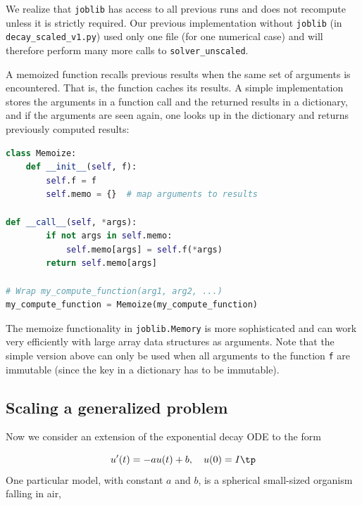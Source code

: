 \documentclass[graybox,envcountchap,sectrefs,final]{svmonodo}
\newenvironment{notice_mdfboxadmon}[1][]{
\begin{notice_mdfboxmdframed}[frametitle=#1]
}
{
\end{notice_mdfboxmdframed}
}
\begin{document}
We realize that \texttt{joblib} has access to all previous runs and does not
recompute unless it is strictly required. Our previous implementation
without \texttt{joblib} (in \Verb!decay_scaled_v1.py!)
used only one file (for one numerical case)
and will therefore perform many more calls to
\Verb!solver_unscaled!.



\begin{notice_mdfboxadmon}
A memoized function recalls
previous results when the same set
of arguments is encountered. That is, the function caches its results.
A simple implementation stores the arguments in a function call and
the returned results in a
dictionary, and if the arguments are seen again, one looks up
in the dictionary and returns previously computed results:

\begin{lstlisting}[language=Python,style=graycolor]
class Memoize:
    def __init__(self, f):
        self.f = f
        self.memo = {}  # map arguments to results

def __call__(self, *args):
        if not args in self.memo:
            self.memo[args] = self.f(*args)
        return self.memo[args]

# Wrap my_compute_function(arg1, arg2, ...)
my_compute_function = Memoize(my_compute_function)
\end{lstlisting}
The memoize functionality in \texttt{joblib.Memory} is more sophisticated and
can work very efficiently with large array data structures as arguments.
Note that the simple version above can only be used when all arguments to
the function \texttt{f} are immutable (since the key in a dictionary has to be
immutable).
\end{notice_mdfboxadmon}



\subsection{Scaling a generalized problem}
\label{sec:scale:body}

Now we consider an extension of the exponential decay ODE to the
form

\begin{equation}
u'(t) = -au(t) + b,\quad u(0)=I
\label{scale:model:g}
\tp
\end{equation}
One particular model, with constant $a$ and $b$,
is a spherical small-sized organism falling in air,
\end{document}
